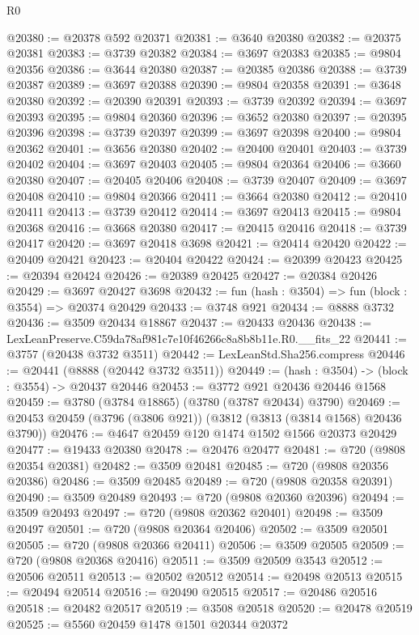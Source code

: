 \begin{lexlean}{R0}
\begin{coremodule}
@20380 := @20378 @592 @20371
@20381 := @3640 @20380
@20382 := @20375 @20381
@20383 := @3739 @20382
@20384 := @3697 @20383
@20385 := @9804 @20356
@20386 := @3644 @20380
@20387 := @20385 @20386
@20388 := @3739 @20387
@20389 := @3697 @20388
@20390 := @9804 @20358
@20391 := @3648 @20380
@20392 := @20390 @20391
@20393 := @3739 @20392
@20394 := @3697 @20393
@20395 := @9804 @20360
@20396 := @3652 @20380
@20397 := @20395 @20396
@20398 := @3739 @20397
@20399 := @3697 @20398
@20400 := @9804 @20362
@20401 := @3656 @20380
@20402 := @20400 @20401
@20403 := @3739 @20402
@20404 := @3697 @20403
@20405 := @9804 @20364
@20406 := @3660 @20380
@20407 := @20405 @20406
@20408 := @3739 @20407
@20409 := @3697 @20408
@20410 := @9804 @20366
@20411 := @3664 @20380
@20412 := @20410 @20411
@20413 := @3739 @20412
@20414 := @3697 @20413
@20415 := @9804 @20368
@20416 := @3668 @20380
@20417 := @20415 @20416
@20418 := @3739 @20417
@20420 := @3697 @20418 @3698
@20421 := @20414 @20420
@20422 := @20409 @20421
@20423 := @20404 @20422
@20424 := @20399 @20423
@20425 := @20394 @20424
@20426 := @20389 @20425
@20427 := @20384 @20426
@20429 := @3697 @20427 @3698
@20432 := fun (hash : @3504) => fun (block : @3554) => @20374 @20429
@20433 := @3748 @921
@20434 := @8888 @3732
@20436 := @3509 @20434 @18867
@20437 := @20433 @20436
@20438 := LexLeanPreserve.C59da78af981c7e10f46266c8a8b8b11e.R0.__fits_22
@20441 := @3757 (@20438 @3732 @3511)
@20442 := LexLeanStd.Sha256.compress
@20446 := @20441 (@8888 (@20442 @3732 @3511))
@20449 := (hash : @3504) -> (block : @3554) -> @20437 @20446
@20453 := @3772 @921 @20436 @20446 @1568
@20459 := @3780 (@3784 @18865) (@3780 (@3787 @20434) @3790)
@20469 := @20453 @20459 (@3796 (@3806 @921)) (@3812 (@3813 (@3814 @1568) @20436 @3790))
@20476 := @4647 @20459 @120 @1474 @1502 @1566 @20373 @20429
@20477 := @19433 @20380
@20478 := @20476 @20477
@20481 := @720 (@9808 @20354 @20381)
@20482 := @3509 @20481
@20485 := @720 (@9808 @20356 @20386)
@20486 := @3509 @20485
@20489 := @720 (@9808 @20358 @20391)
@20490 := @3509 @20489
@20493 := @720 (@9808 @20360 @20396)
@20494 := @3509 @20493
@20497 := @720 (@9808 @20362 @20401)
@20498 := @3509 @20497
@20501 := @720 (@9808 @20364 @20406)
@20502 := @3509 @20501
@20505 := @720 (@9808 @20366 @20411)
@20506 := @3509 @20505
@20509 := @720 (@9808 @20368 @20416)
@20511 := @3509 @20509 @3543
@20512 := @20506 @20511
@20513 := @20502 @20512
@20514 := @20498 @20513
@20515 := @20494 @20514
@20516 := @20490 @20515
@20517 := @20486 @20516
@20518 := @20482 @20517
@20519 := @3508 @20518
@20520 := @20478 @20519
@20525 := @5560 @20459 @1478 @1501 @20344 @20372

\end{coremodule}
\end{lexlean}

